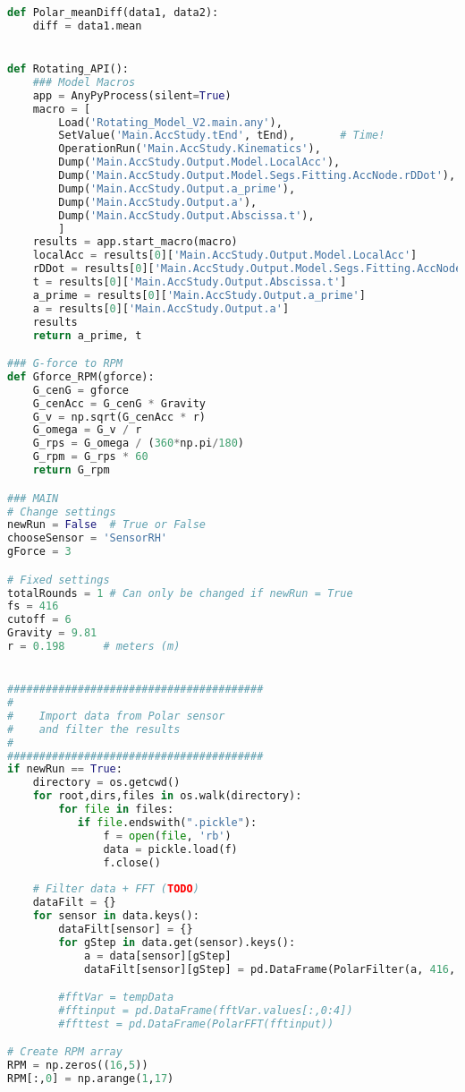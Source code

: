 \begin{lstlisting}[language=Python]
def Polar_meanDiff(data1, data2):
    diff = data1.mean


def Rotating_API():
    ### Model Macros
    app = AnyPyProcess(silent=True)
    macro = [
        Load('Rotating_Model_V2.main.any'),
        SetValue('Main.AccStudy.tEnd', tEnd),       # Time!
        OperationRun('Main.AccStudy.Kinematics'),
        Dump('Main.AccStudy.Output.Model.LocalAcc'),
        Dump('Main.AccStudy.Output.Model.Segs.Fitting.AccNode.rDDot'),
        Dump('Main.AccStudy.Output.a_prime'),
        Dump('Main.AccStudy.Output.a'),
        Dump('Main.AccStudy.Output.Abscissa.t'),
        ]    
    results = app.start_macro(macro)
    localAcc = results[0]['Main.AccStudy.Output.Model.LocalAcc']
    rDDot = results[0]['Main.AccStudy.Output.Model.Segs.Fitting.AccNode.rDDot']
    t = results[0]['Main.AccStudy.Output.Abscissa.t']
    a_prime = results[0]['Main.AccStudy.Output.a_prime']
    a = results[0]['Main.AccStudy.Output.a']
    results
    return a_prime, t

### G-force to RPM
def Gforce_RPM(gforce):
    G_cenG = gforce
    G_cenAcc = G_cenG * Gravity
    G_v = np.sqrt(G_cenAcc * r)
    G_omega = G_v / r
    G_rps = G_omega / (360*np.pi/180)
    G_rpm = G_rps * 60
    return G_rpm

### MAIN
# Change settings
newRun = False  # True or False
chooseSensor = 'SensorRH'
gForce = 3

# Fixed settings
totalRounds = 1 # Can only be changed if newRun = True
fs = 416
cutoff = 6
Gravity = 9.81
r = 0.198      # meters (m)


########################################
#
#    Import data from Polar sensor 
#    and filter the results
#
########################################
if newRun == True:
    directory = os.getcwd()
    for root,dirs,files in os.walk(directory):
        for file in files:
           if file.endswith(".pickle"):  
               f = open(file, 'rb')
               data = pickle.load(f) 
               f.close()
    
    # Filter data + FFT (TODO)
    dataFilt = {}
    for sensor in data.keys():
        dataFilt[sensor] = {}
        for gStep in data.get(sensor).keys():
            a = data[sensor][gStep]
            dataFilt[sensor][gStep] = pd.DataFrame(PolarFilter(a, 416, 4, cutoff))

        #fftVar = tempData
        #fftinput = pd.DataFrame(fftVar.values[:,0:4])
        #ffttest = pd.DataFrame(PolarFFT(fftinput))

# Create RPM array
RPM = np.zeros((16,5))
RPM[:,0] = np.arange(1,17)


\end{lstlisting}
